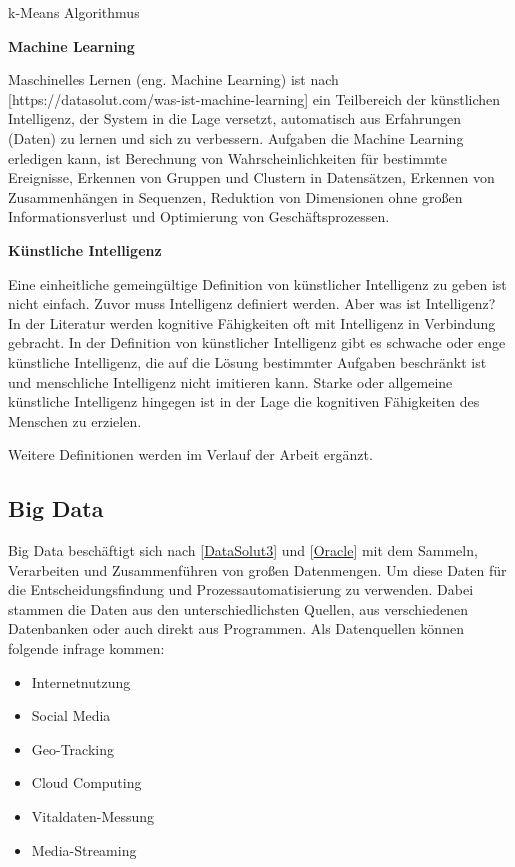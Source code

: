 k-Means Algorithmus\vspace{0.5cm}

\textbf{Machine Learning}\vspace{0.2cm}

Maschinelles Lernen (eng. Machine Learning) ist nach [https://datasolut.com/was-ist-machine-learning] ein Teilbereich der künstlichen Intelligenz, der System in die Lage versetzt, automatisch aus Erfahrungen (Daten) zu lernen und sich zu verbessern. Aufgaben die Machine Learning erledigen kann, ist Berechnung von Wahrscheinlichkeiten für bestimmte Ereignisse, Erkennen von Gruppen und Clustern in Datensätzen, Erkennen von Zusammenhängen in Sequenzen, Reduktion von Dimensionen ohne großen Informationsverlust und Optimierung von Geschäftsprozessen.\vspace{0.5cm}

\textbf{Künstliche Intelligenz}\vspace{0.2cm}

Eine einheitliche gemeingültige Definition von künstlicher Intelligenz zu geben ist nicht einfach. Zuvor muss Intelligenz definiert werden. Aber was ist Intelligenz? In der Literatur werden kognitive Fähigkeiten oft mit Intelligenz in Verbindung gebracht.
In der Definition von künstlicher Intelligenz gibt es schwache oder enge künstliche Intelligenz, die auf die Lösung bestimmter Aufgaben beschränkt ist und menschliche Intelligenz nicht imitieren kann. Starke oder allgemeine künstliche Intelligenz hingegen ist in der Lage die kognitiven Fähigkeiten des Menschen zu erzielen.\vspace{0.5cm}

Weitere Definitionen werden im Verlauf der Arbeit ergänzt.

\subsection{Big Data}
Big Data beschäftigt sich nach [\href{https://datasolut.com/was-ist-big-data}{DataSolut3}] und [\href{https://www.oracle.com/de/big-data/what-is-big-data}{Oracle}] mit dem Sammeln, Verarbeiten und Zusammenführen von großen Datenmengen. Um diese Daten für die Entscheidungsfindung und Prozessautomatisierung zu verwenden. Dabei stammen die Daten aus den unterschiedlichsten Quellen, aus verschiedenen Datenbanken oder auch direkt aus Programmen. Als Datenquellen können folgende infrage kommen:

\begin{itemize}
	\item Internetnutzung
	\item Social Media
	\item Geo-Tracking
	\item Cloud Computing
	\item Vitaldaten-Messung
	\item Media-Streaming
\end{itemize}

